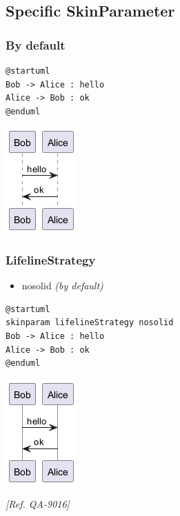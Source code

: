 \subsection{Specific SkinParameter}


\subsubsection{By default}
\begin{verbatim}
@startuml
Bob -> Alice : hello
Alice -> Bob : ok
@enduml
\end{verbatim}
\begin{center}
\includegraphics[scale=0.60]{imgw/img-81a4f72445c3c52b7cc56732406a1dc3.png}
\end{center}


\subsubsection{LifelineStrategy }


\begin{itemize}
\item nosolid \textit{(by default)}
\end{itemize}
\begin{verbatim}
@startuml
skinparam lifelineStrategy nosolid
Bob -> Alice : hello
Alice -> Bob : ok
@enduml
\end{verbatim}
\begin{center}
\includegraphics[scale=0.60]{imgw/img-0a0f41aa2176b75595f9e713f174827a.png}
\end{center}
\textit{[Ref. QA-9016]}


